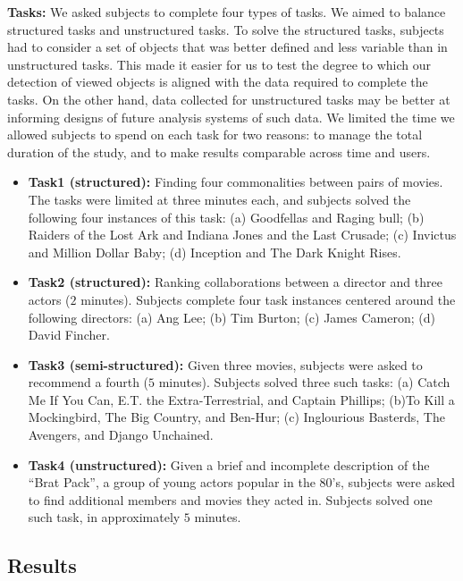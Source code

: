 \noindent\textbf{Tasks:} We asked subjects to complete four types of tasks. We aimed to balance structured tasks and unstructured tasks. To solve the structured tasks, subjects had to consider a set of objects that was better defined and less variable than in unstructured tasks. This made it easier for us to test the degree to which our detection of viewed objects is aligned with the data required to complete the tasks. On the other hand, data collected for unstructured tasks may be better at informing designs of future analysis systems of such data. We limited the time we allowed subjects to spend on each task for two reasons: to manage the total duration of the study, and to make results comparable across time and users.

\begin{itemize}
\item \textbf{Task1 (structured):} Finding four commonalities between pairs of movies. The tasks were limited at three minutes each, and subjects solved the following four instances of this task: (a) Goodfellas and Raging bull; (b) Raiders of the Lost Ark and Indiana Jones and the Last Crusade; (c) Invictus and Million Dollar Baby; (d) Inception and The Dark Knight Rises.  
\item \textbf{Task2 (structured):} Ranking collaborations between a director and three actors ($2$ minutes).  Subjects complete four task instances centered around the following directors: (a) Ang Lee; (b) Tim Burton; (c) James Cameron; (d) David Fincher. 
\item \textbf{Task3 (semi-structured):} Given three movies, subjects were asked to recommend a fourth ($5$ minutes). Subjects solved three such tasks: (a) Catch Me If You Can, E.T. the Extra-Terrestrial, and Captain Phillips; (b)To Kill a Mockingbird, The Big Country, and Ben-Hur; (c) Inglourious Basterds, The Avengers, and Django Unchained.



\item \textbf{Task4 (unstructured):} Given a brief and incomplete description of the ``Brat Pack'', a group of young actors popular in the 80's, subjects were asked to find additional members and movies they acted in. Subjects solved one such task, in approximately $5$ minutes. 
\end{itemize}


\subsection{Results}

